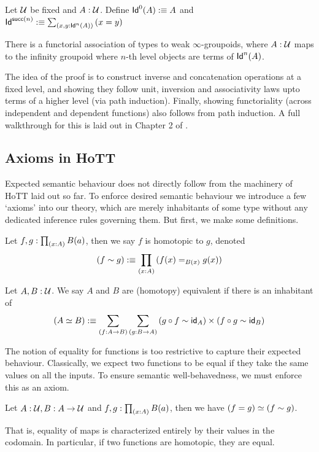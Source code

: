 Let $\mathcal{U}$ be fixed and $A : \mathcal{U}$. Define $\mathsf{Id}^0(A) :\equiv A$ and $\mathsf{Id}^{\mathsf{succ}(n)} :\equiv \sum_{(x,y : \mathsf{Id}^n(A))}{(x =y)}$ 
\begin{theorem}
  There is a functorial association of types to weak $\infty$-groupoids, where $A : \mathcal{U}$ maps to the infinity groupoid where $n$-th level objects are terms of 
  $\mathsf{Id}^n(A)$.
\end{theorem}
The idea of the proof is to construct inverse and concatenation operations at a fixed level, and showing they follow
unit, inversion and associativity laws upto terms of a higher level (via path induction). Finally, showing functoriality (across independent
and dependent functions) also follows from path induction.
A full walkthrough for this is laid out in Chapter 2 of \cite{HoTT}.

\subsection{Axioms in HoTT}
Expected semantic behaviour does not directly follow from the machinery of HoTT laid out so far. To enforce desired semantic behaviour
we introduce a few `axioms' into our theory, which are merely inhabitants of some type without any dedicated inference rules governing them. But first,
we make some definitions.

\begin{definition} 
  Let $f, g : \prod_{(x:A)}{B(a)}$, then we say $f$ is homotopic to $g$, denoted
  \[
    (f \sim g) :\equiv \prod_{(x:A)}{(f(x) =_{B(x)} g(x))}
  \]
\end{definition}

\begin{definition}[Equivalence]
  Let $A, B : \mathcal{U}$. We say $A$ and $B$ are (homotopy) equivalent if there is an inhabitant of 
  \[
    (A \simeq B) :\equiv \sum_{(f : A \to B)}{\sum_{(g : B \to A)}{(g \circ f \sim \mathsf{id}_A) \times (f \circ g \sim \mathsf{id}_B)}}
  \]
\end{definition}

The notion of equality for functions is too restrictive to capture their expected behaviour.
Classically, we expect two functions to be equal if they take the same values on all the inputs.
To ensure semantic well-behavedness, we must enforce this as an axiom.

\begin{axiom}
   Let $A : \mathcal{U}, B : A \to \mathcal{U}$ and $f, g : \prod_{(x:A)}{B(a)}$, then we have
   $    (f = g) \simeq (f \sim g)$. 
\end{axiom}
That is, equality of maps is characterized entirely by their values in the codomain.
In particular, if two functions are homotopic, they are equal.

